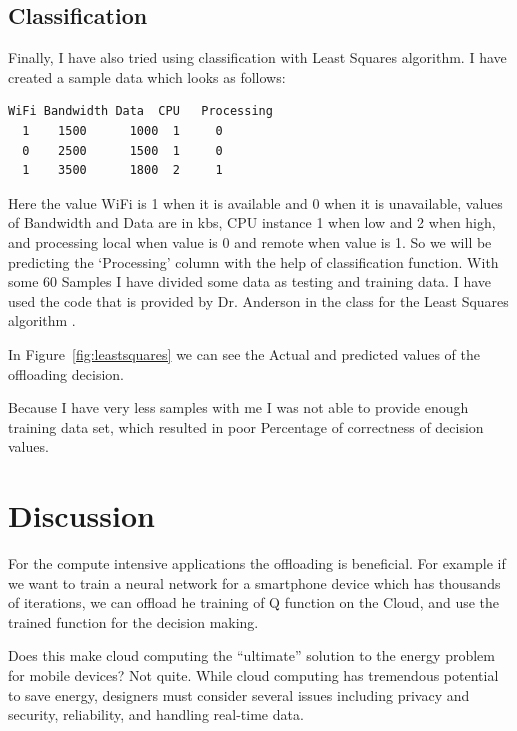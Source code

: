 \documentclass{article}
\begin{document}
\subsection{Classification}
Finally, I have also tried using classification with Least Squares algorithm. I have created a sample data which looks as follows:
\begin{small}  %
\begin{lstlisting}
WiFi Bandwidth Data  CPU   Processing
  1    1500      1000  1     0
  0    2500      1500  1     0
  1    3500      1800  2     1
\end{lstlisting}
\end{small}
Here the value WiFi is 1 when it is available and 0 when it is unavailable, values of Bandwidth and Data are in kbs, CPU instance 1 when low and 2 when high, and processing local when value is 0 and remote when value is 1. So we will be predicting the `Processing' column with the help of classification function. 
With some 60 Samples I have divided some data as testing and training data. I have used the code that is provided by Dr. Anderson in the class for the Least Squares algorithm \cite{CS545}.\par
In Figure~\ref{fig:leastsquares} we can see the Actual and predicted values of the offloading decision. 

Because I have very less samples with me I was not able to provide enough training data set, which resulted in poor Percentage of correctness of decision values.

\section{Discussion}
For the compute intensive applications the offloading is beneficial. For example if we
want to train a neural network for a smartphone device which has thousands of iterations, we
can offload he training of Q function on the Cloud, and use the trained function for the decision making.\par
Does this make cloud computing the “ultimate” solution to the energy problem for mobile devices? Not
quite. While cloud computing has tremendous potential to save energy, designers must consider several issues including privacy and security, reliability, and handling real-time data\cite{kumar2010cloud}.
\end{document}

